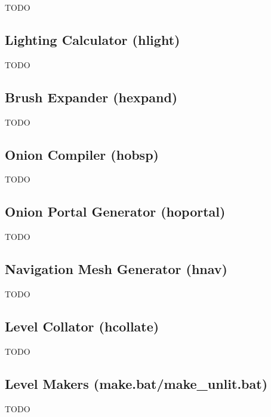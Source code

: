 TODO

\subsection{Lighting Calculator (hlight)}

TODO

\subsection{Brush Expander (hexpand)}

TODO

\subsection{Onion Compiler (hobsp)}

TODO

\subsection{Onion Portal Generator (hoportal)}

TODO

\subsection{Navigation Mesh Generator (hnav)}

TODO

\subsection{Level Collator (hcollate)}

TODO

\subsection{Level Makers (make.bat/make\_unlit.bat)}

TODO
